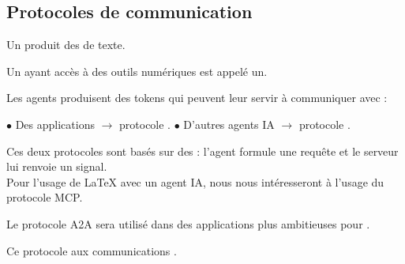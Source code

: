\subsection{Protocoles de communication}
\begin{Definition}
    Un  produit des  de texte. 

    Un  ayant accès à des outils numériques est appelé un.

    Les agents produisent des tokens qui peuvent leur servir à communiquer avec : 

    \begin{MultiColonnes}{2}
        \tcbitem $\bullet$ Des applications $\rightarrow$ protocole . 
        \tcbitem $\bullet$ D'autres agents IA $\rightarrow$ protocole . 
    \end{MultiColonnes}

    Ces deux protocoles sont basés sur des  : l'agent formule une requête et le serveur lui renvoie un signal. \\

    Pour l'usage de LaTeX avec un agent IA, nous nous intéresseront à l'usage du protocole MCP.

    Le protocole A2A sera utilisé dans des applications plus ambitieuses pour . 

    Ce protocole  aux communications .
\end{Definition}

